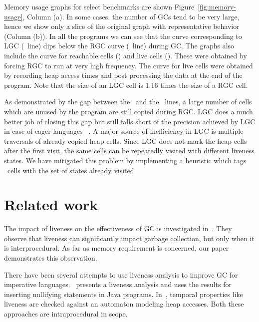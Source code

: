 \documentclass[9pt,preprint,letter,nonatbib]{sigplanconf}
\begin{document}
Memory  usage graphs  for select  benchmarks are  shown
Figure~\ref{fig:memory-usage},  Column   (a).   In some cases, the
number of  GCs  tend to be  very large,
hence  we  show only  a  slice of the original graph  with 
representative    behavior  (Column (b)).  In all the programs we can see
that  the   curve  corresponding  to  LGC   (\LGCLine\ line)
dips   below the RGC curve 
(\RGCLine\ line) during GC.  The graphs also include the
curve    for   reachable    cells   (\ReachLine)  and live cells
(\UseLine). These were  obtained
 by forcing  RGC to  run at   very  high
frequency. The curve for live cells were obtained by recording heap
access times and post processing the data 
at the end of the program. Note that the size of an LGC cell is 1.16
times the size of a RGC cell.


As  demonstrated by  the gap  between the  \RGCLine\ and  the \UseLine\
lines, a  large number of  cells which are  unused by the  program are
still copied  during RGC. LGC does  a much better job  of closing this
gap but still falls short of the  precision achieved by LGC in case of
eager languages ~\cite{asati14lgc}.  A major source of inefficiency in
LGC is  multiple traversals  of already copied  heap cells.  Since LGC
does not mark the heap cells after the first visit, the same cells can
be  repeatedly  visited  with   different  liveness  states.  We  have
mitigated  this  problem  by   implementing  a  heuristic  which  tags
\CONS\ cells with the set of states already visited.


\vspace*{-2mm}
\section{Related work} 
\label{sec:relatedwork}
The impact of  liveness on the effectiveness of  GC is
investigated in~\cite{Hirzel}.   They observe that  liveness can
significantly  impact   garbage  collection,  but  only   when  it  is
interprocedural.  As far as memory requirement is concerned, our paper
demonstrates this observation.

There have been  several attempts to use liveness  analysis to improve
GC for imperative  languages.~\cite{khedker07heap} presents a liveness
analysis and uses  the results for inserting  nullifying statements in
Java  programs. In~\cite{ran.shaham-sas03},  temporal properties  like
liveness  are checked  against an  automaton modeling  heap accesses.
Both these approaches are intraprocedural in scope.
\end{document}
